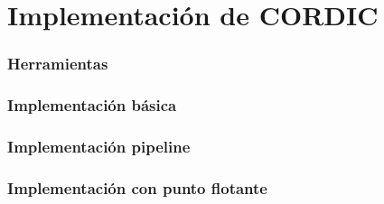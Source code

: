 \chapter{Implementación de CORDIC}

\subsection{Herramientas}

\subsection{Implementación básica}

\subsection{Implementación pipeline}

\subsection{Implementación con punto flotante}